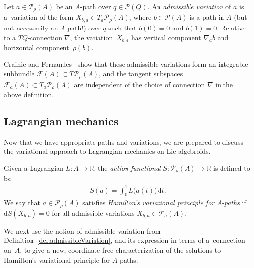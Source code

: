 \documentclass[10pt,a4paper]{amsart}
\numberwithin{equation}{section}
\begin{document}
\begin{Definition}\label{def:admissibleVariation}
Let $ a \in \mathcal{P} _\rho (A) $ be an $A$-path over $ q \in \mathcal{P} (Q) $. An \emph{admissible variation} of $a$ is a~variation of the form $ X _{ b, a } \in T _a \mathcal{P} _\rho (A) $, where $ b \in \mathcal{P} (A) $ is a path in $A$ (but not necessarily an $A$-path!) over $q$ such that $ b (0) = 0 $ and $ b (1) = 0 $. Relative to a $ T Q $-connection $ \nabla $, the varia\-tion~$ X _{ b, a } $ has vertical component $ \overline{\nabla } _a b $ and horizontal component~$ \rho (b) $.
\end{Definition}

\begin{Remark} \label{rmk:admissibleSubbundle} Crainic and Fernandes~\cite[Proposition~4.7]{CrFe2003} show that these admissible variations form an integrable subbundle $ \mathcal{F} (A) \subset T \mathcal{P} _\rho (A) $, and the tangent subspaces $ \mathcal{F} _a (A) \subset T _a \mathcal{P} _\rho (A) $ are independent of the choice of connection $ \nabla $ in the above def\/inition.
\end{Remark}

\subsection{Lagrangian mechanics}\label{sec:algebroidLagrangianMechanics}

Now that we have appropriate paths and variations, we are prepared to discuss the variational approach to Lagrangian mechanics on Lie algebroids.

\begin{Definition} Given a Lagrangian $ L \colon A \rightarrow \mathbb{R} $, the \emph{action functional} $ S \colon \mathcal{P} _\rho (A) \rightarrow \mathbb{R} $ is def\/ined to be
 \begin{gather*}
 S (a) = \int _0 ^1 L \bigl( a (t) \bigr) \,\mathrm{d}t .
 \end{gather*}
We say that $ a \in \mathcal{P} _\rho (A) $ satisf\/ies \emph{Hamilton's variational principle for $A$-paths} if $ \mathrm{d} S ( X _{ b , a } ) = 0 $ for all admissible variations $ X _{ b, a } \in \mathcal{F} _a (A) $.
\end{Definition}

We next use the notion of admissible variation from Def\/inition~\ref{def:admissibleVariation}, and its expression in terms of a~connection on~$A$, to give a new, coordinate-free characterization of the solutions to Hamilton's variational principle for $A$-paths.
\end{document}
